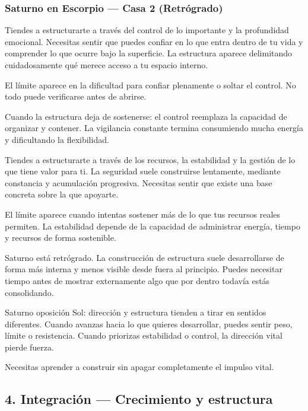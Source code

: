 \documentclass[11pt,a4paper]{article}
\begin{document}
\subsubsection*{
Saturno en Escorpio
— Casa 2 (Retrógrado)
}

Tiendes a estructurarte a través del control de lo importante y la profundidad emocional. Necesitas sentir que puedes confiar en lo que entra dentro de tu vida y comprender lo que ocurre bajo la superficie. La estructura aparece delimitando cuidadosamente qué merece acceso a tu espacio interno.

El límite aparece en la dificultad para confiar plenamente o soltar el control. No todo puede verificarse antes de abrirse.

Cuando la estructura deja de sostenerse: el control reemplaza la capacidad de organizar y contener. La vigilancia constante termina consumiendo mucha energía y dificultando la flexibilidad.

Tiendes a estructurarte a través de los recursos, la estabilidad y la gestión de lo que tiene valor para ti. La seguridad suele construirse lentamente, mediante constancia y acumulación progresiva. Necesitas sentir que existe una base concreta sobre la que apoyarte.

El límite aparece cuando intentas sostener más de lo que tus recursos reales permiten. La estabilidad depende de la capacidad de administrar energía, tiempo y recursos de forma sostenible.

Saturno está retrógrado. La construcción de estructura suele desarrollarse de forma más interna y menos visible desde fuera al principio. Puedes necesitar tiempo antes de mostrar externamente algo que por dentro todavía estás consolidando.

Saturno oposición Sol: dirección y estructura tienden a tirar en sentidos diferentes. Cuando avanzas hacia lo que quieres desarrollar, puedes sentir peso, límite o resistencia. Cuando priorizas estabilidad o control, la dirección vital pierde fuerza.

Necesitas aprender a construir sin apagar completamente el impulso vital.

\vspace{0.8cm}


\subsection{4. Integración — Crecimiento y estructura}
\end{document}
